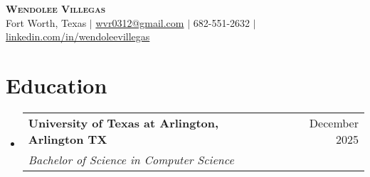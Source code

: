 \documentclass[letterpaper,11pt]{article}
\makeatletter
\newcommand{\resumeItem}[1]{
  \item\small{
    {#1 \vspace{-2pt}}
  }
}
\newcommand{\resumeSubheading}[4]{
  \vspace{-2pt}\item
    \begin{tabular*}{0.97\textwidth}[t]{l@{\extracolsep{\fill}}r}
      \textbf{#1} & #2 \\
      \textit{\small#3} & \textit{\small #4} \\
    \end{tabular*}\vspace{-7pt}
}
\newcommand{\resumeSubHeadingListStart}{\begin{itemize}[leftmargin=0.15in, label={}]}
\newcommand{\resumeSubHeadingListEnd}{\end{itemize}}
\makeatother
\begin{document}

\begin{center}
    \textbf{\Huge \scshape Wendolee Villegas} \\ \vspace{1pt}
    \small Fort Worth, Texas $|$ \href{mailto:x@x.com}{{wvr0312@gmail.com}} $|$ \small 682-551-2632 $|$
    \href{https://www.linkedin.com/in/wendolee-villegas-565440252/}{{linkedin.com/in/wendoleevillegas}}
\end{center}


\section{Education}
  \resumeSubHeadingListStart
    \resumeSubheading
      {University of Texas at Arlington, Arlington TX}{December 2025}
      {Bachelor of Science in Computer Science}{}
  \resumeSubHeadingListEnd
\end{document}

